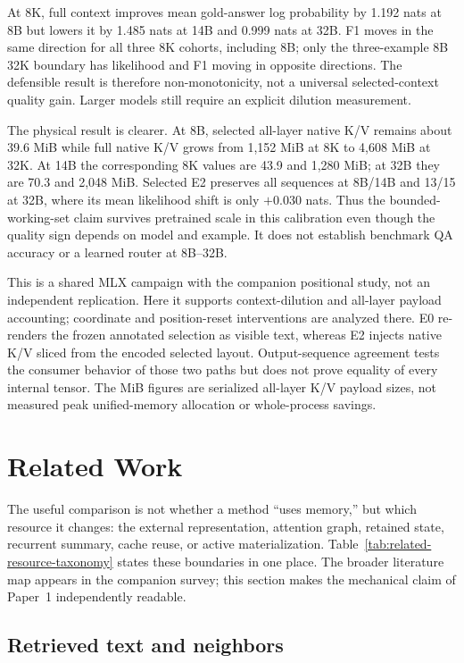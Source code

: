 \documentclass[11pt]{article}
\begin{document}
At 8K, full context improves mean gold-answer log probability by 1.192 nats at 8B but
lowers it by 1.485 nats at 14B and 0.999 nats at 32B.
F1 moves in the same direction for all three 8K cohorts, including 8B;
only the three-example 8B 32K boundary has likelihood and F1 moving in opposite
directions. The defensible result is therefore non-monotonicity,
not a universal selected-context quality gain. Larger models still require an explicit
dilution measurement.

The physical result is clearer. At 8B, selected all-layer native K/V remains about 39.6
MiB while full native K/V grows from 1,152 MiB at 8K to 4,608 MiB at 32K.
At 14B the corresponding 8K values are 43.9 and 1,280 MiB;
at 32B they are 70.3 and 2,048 MiB. Selected E2 preserves all sequences at 8B/14B and
13/15 at 32B, where its mean likelihood shift is only $+0.030$ nats.
Thus the bounded-working-set claim survives pretrained scale in this calibration even
though the quality sign depends on model and example.
It does not establish benchmark QA accuracy or a learned router at 8B--32B.

This is a shared MLX campaign with the companion positional study,
not an independent replication. Here it supports context-dilution and all-layer payload
accounting; coordinate and position-reset interventions are analyzed there.
E0 re-renders the frozen annotated selection as visible text,
whereas E2 injects native K/V sliced from the encoded selected layout.
Output-sequence agreement tests the consumer behavior of those two paths but does not
prove equality of every internal tensor. The MiB figures are serialized all-layer K/V
payload sizes, not measured peak unified-memory allocation or whole-process savings.

\section{Related Work}
\label{sec:relwork}

The useful comparison is not whether a method ``uses memory,'' but which resource it
changes: the external representation, attention graph, retained state,
recurrent summary, cache reuse, or active materialization.
Table~\ref{tab:related-resource-taxonomy} states these boundaries in one place.
The broader literature map appears in the companion survey;
this section makes the mechanical claim of Paper~1 independently readable.

\subsection{Retrieved text and neighbors}
\end{document}
